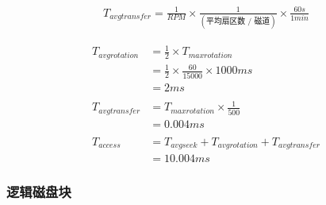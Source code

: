{{{\begin{description}
{                    \begin{align*}
                        T_{avg transfer} = \frac{1}{RPM} \times \frac{1}{(\text{平均扇区数 / 磁道})} \times \frac{60s}{1min}
                    \end{align*}
                }
            \end{description}

            \begin{practicec}
                \begin{align*}
                    T_{avg rotation}
                    &= \frac{1}{2} \times T_{max rotation} \\
                    &= \frac{1}{2} \times \frac{60}{15000} \times 1000ms \\
                    &= 2ms \\
                    \\
                    T_{avg transfer}
                    &= T_{max rotation} \times \frac{1}{500} \\
                    &= 0.004ms \\
                    \\
                    T_{access}
                    &= T_{avg seek} + T_{avg rotation} + T_{avg transfer} \\
                    &= 10.004ms
                \end{align*}
            \end{practicec}
        }

        \subsubsection{逻辑磁盘块}
        {

        }
    }
}
